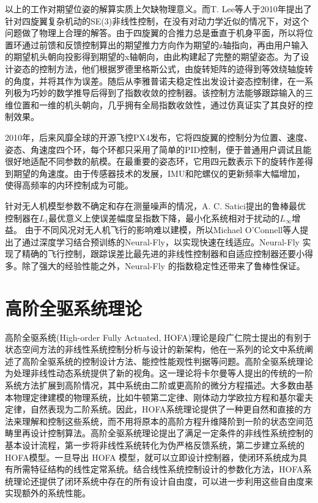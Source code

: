 以上的工作对期望位姿的解算实质上欠缺物理意义。而T. Lee等人于2010年提出了针对四旋翼复杂机动的SE(3)非线性控制\cite{Lee2010}，在没有对动力学近似的情况下，对这个问题做了物理上合理的解答。由于四旋翼的合推力总是垂直于机身平面，所以将位置环通过前馈和反馈控制算出的期望推力方向作为期望的z轴指向，再由用户输入的期望机头朝向投影得到期望的x轴朝向，由此构建起了完整的期望姿态。为了设计姿态的控制方法，他们根据罗德里格斯公式，由旋转矩阵的迹得到等效绕轴旋转的角度，并将其作为误差。随后从李雅普诺夫稳定性出发设计姿态控制律，在一系列极为巧妙的数学推导后得到了指数收敛的控制器。该控制方法能够跟踪输入的三维位置和一维的机头朝向，几乎拥有全局指数收敛性，通过仿真证实了其良好的控制效果。

2010年，后来风靡全球的开源飞控PX4发布\cite{brescianini2013nonlinear}，它将四旋翼的控制分为位置、速度、姿态、角速度四个环，每个环都只采用了简单的PID控制，便于普通用户调试且能很好地适配不同参数的航模。在最重要的姿态环，它用四元数表示下的旋转作差得到期望的角速度。由于传感器技术的发展，IMU和陀螺仪的更新频率大幅增加，使得高频率的内环控制成为可能。

针对无人机模型参数不确定和存在测量噪声的情况，A. C. Satici提出的鲁棒最优控制器在$L_1$最优意义上使误差幅度呈指数下降，最小化系统相对于扰动的$L_\infty$增益\cite{satici2013robust}。
由于不同风况对无人机飞行的影响难以建模，所以Michael O'Connell等人提出了通过深度学习结合预训练的Neural-Fly\cite{o2022neural}，以实现快速在线适应。Neural-Fly 实现了精确的飞行控制，跟踪误差比最先进的非线性控制器和自适应控制器还要小得多。除了强大的经验性能之外，Neural-Fly 的指数稳定性还带来了鲁棒性保证。

\section{高阶全驱系统理论}
高阶全驱系统(High-order Fully Actuated, HOFA)理论是段广仁院士提出的有别于状态空间方法的非线性系统控制分析与设计的新架构\cite{duan1}\cite{duan2}\cite{duan3}\cite{duan4}\cite{duan5}，他在一系列的论文中系统阐述了高阶全驱系统的控制设计方法、能控性能观性判据等问题\cite{段1}\cite{段2}。高阶全驱系统理论为处理非线性动态系统提供了新的视角。这一理论将卡尔曼等人提出的传统的一阶系统方法扩展到高阶情况，其中系统由二阶或更高阶的微分方程描述。大多数由基本物理定律建模的物理系统，比如牛顿第二定律、刚体动力学欧拉方程和基尔霍夫定律，自然表现为二阶系统。因此，HOFA系统理论提供了一种更自然和直接的方法来理解和控制这些系统，而不用将原本的高阶方程升维降阶到一阶的状态空间范畴里再设计控制算法。高阶全驱系统理论提出了满足一定条件的非线性系统控制的基本设计流程，第一步将非线性系统转化为伪严格反馈系统，第二步建立系统的HOFA模型。一旦导出 HOFA 模型，就可以立即设计控制器，使闭环系统成为具有所需特征结构的线性定常系统。结合线性系统控制设计的参数化方法，HOFA系统理论还提供了闭环系统中存在的所有设计自由度，可以进一步利用这些自由度来实现额外的系统性能。

